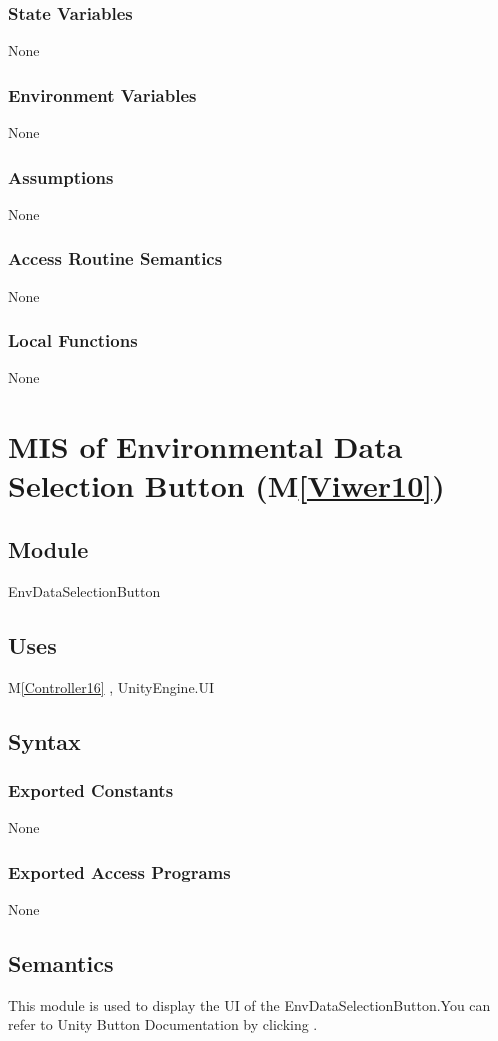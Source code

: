 \documentclass[12pt, titlepage]{article}
\newcommand{\mref}[1]{M\ref{#1}}
\begin{document}
\subsubsection{State Variables}
None
\subsubsection{Environment Variables}
None
\subsubsection{Assumptions}
None
\subsubsection{Access Routine Semantics}
None
\subsubsection{Local Functions}
None


\newpage

\section{MIS of Environmental Data Selection Button
 (\mref{Viwer10})}

\subsection{Module}
EnvDataSelectionButton

\subsection{Uses}
\mref{Controller16}  , UnityEngine.UI

\subsection{Syntax}
\subsubsection{Exported Constants}
None
\subsubsection{Exported Access Programs}
None

\subsection{Semantics}
This module is used to display the UI of the EnvDataSelectionButton.You can refer to Unity Button Documentation by clicking \bref.
\end{document}
